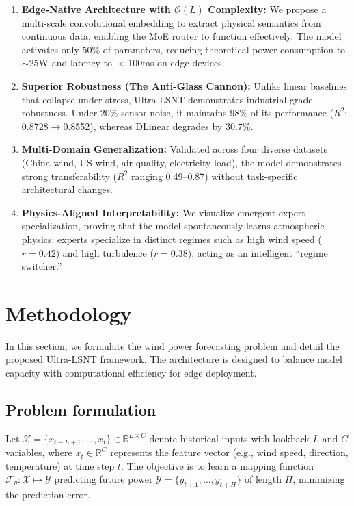 \documentclass[review,3p,times,draft]{elsarticle}
\begin{document}
\begin{enumerate}[label=(\arabic*)]
    \item \textbf{Edge-Native Architecture with $\mathcal{O}(L)$ Complexity:} We propose a multi-scale convolutional embedding to extract physical semantics from continuous data, enabling the MoE router to function effectively. The model activates only 50\% of parameters, reducing theoretical power consumption to $\sim$25W and latency to $<$100ms on edge devices.
    
    \item \textbf{Superior Robustness (The Anti-Glass Cannon):} Unlike linear baselines that collapse under stress, Ultra-LSNT demonstrates industrial-grade robustness. Under 20\% sensor noise, it maintains 98\% of its performance ($R^2$: 0.8728$\rightarrow$0.8552), whereas DLinear degrades by 30.7\%.
    
    \item \textbf{Multi-Domain Generalization:} Validated across four diverse datasets (China wind, US wind, air quality, electricity load), the model demonstrates strong transferability ($R^2$ ranging 0.49--0.87) without task-specific architectural changes.
    
    \item \textbf{Physics-Aligned Interpretability:} We visualize emergent expert specialization, proving that the model spontaneously learns atmospheric physics: experts specialize in distinct regimes such as high wind speed ($r=0.42$) and high turbulence ($r=0.38$), acting as an intelligent ``regime switcher.''
\end{enumerate}

\section{Methodology}
\label{sec:method}

In this section, we formulate the wind power forecasting problem and detail the proposed Ultra-LSNT framework. The architecture is designed to balance model capacity with computational efficiency for edge deployment.

\subsection{Problem formulation}
Let $\mathcal{X} = \{x_{t-L+1}, \dots, x_t\} \in \mathbb{R}^{L \times C}$ denote historical inputs with lookback $L$ and $C$ variables, where $x_t \in \mathbb{R}^{C}$ represents the feature vector (e.g., wind speed, direction, temperature) at time step $t$. The objective is to learn a mapping function $\mathcal{F}_\theta: \mathcal{X} \mapsto \mathcal{Y}$ predicting future power $\mathcal{Y} = \{y_{t+1}, \dots, y_{t+H}\}$ of length $H$, minimizing the prediction error.
\end{document}
